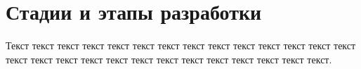 \newpage\section{Стадии и этапы разработки}\label{section:Стадии и этапы разработки}

Текст текст текст текст текст текст текст текст текст текст текст текст текст текст текст текст текст текст текст текст текст текст текст текст текст текст текст.